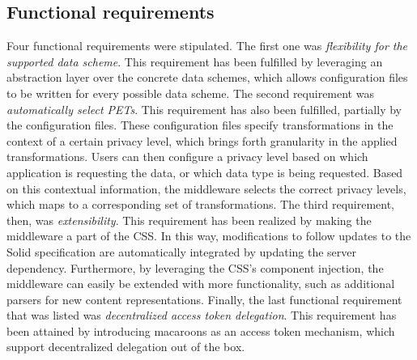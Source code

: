 \subsection{Functional requirements}
Four functional requirements were stipulated. The first one was \textit{flexibility for the supported data scheme}. This requirement has been fulfilled by leveraging an abstraction layer over the concrete data schemes, which allows configuration files to be written for every possible data scheme. The second requirement was \textit{automatically select \gls{PETs}}. This requirement has also been fulfilled, partially by the configuration files. These configuration files specify transformations in the context of a certain privacy level, which brings forth granularity in the applied transformations. Users can then configure a privacy level based on which application is requesting the data, or which data type is being requested. Based on this contextual information, the middleware selects the correct privacy levels, which maps to a corresponding set of transformations. The third requirement, then, was \textit{extensibility}. This requirement has been realized by making the middleware a part of the \acrlong{CSS}. In this way, modifications to follow updates to the Solid specification are automatically integrated by updating the server dependency. Furthermore, by leveraging the \gls{CSS}'s component injection, the middleware can easily be extended with more functionality, such as additional parsers for new content representations. Finally, the last functional requirement that was listed was \textit{decentralized access token delegation}. This requirement has been attained by introducing macaroons as an access token mechanism, which support decentralized delegation out of the box.

